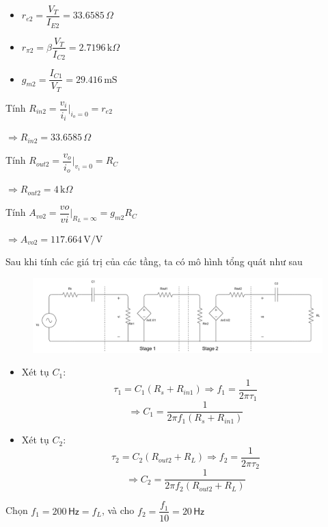 \begin{itemize}[label=-]
	\begin{itemize}[label=+, leftmargin=2cm]
		\item $r_{e2} = \dfrac{V_{T}}{I_{E2}} = 33.6585\,\Omega$
		\item $r_{\pi2} = \beta\dfrac{V_{T}}{I_{C2}} = 2.7196\,\text{k}\Omega$
		\item $g_{m2} = \dfrac{I_{C1}}{V_{T}} = 29.416\,\text{mS}$
	\end{itemize}
	
	Tính $R_{in2} = \dfrac{v_{i}}{i_{i}}\bigg|_{i_{o} = 0} = r_{e2}$
	
	$\Rightarrow R_{in2} = 33.6585\,\Omega$
	
	Tính $R_{out2} = \dfrac{v_{o}}{i_{o}}\bigg|_{v_{i} = 0} = R_{C}$
	
	$\Rightarrow R_{out2} = 4\,\text{k}\Omega$
	
	Tính $A_{vo2} = \dfrac{vo}{vi}\bigg|_{R_{L} = \infty} = g_{m2} R_{C}$
	
	$\Rightarrow A_{vo2} = 117.664\,\text{V/V}$
\end{itemize}

Sau khi tính các giá trị của các tầng, ta có mô hình tổng quát như sau

\begin{figure}[H]
	\centering
	\includegraphics[width=\linewidth]{./my-chapters/my-diagrams/Question5/c_tonghopmach.png}
\end{figure}

\begin{itemize}[label=-]
	\item Xét tụ $C_{1}$:
	\[ \tau_1 = C_{1} \left( R_{s} + R_{in1} \right) \Rightarrow f_{1} = \dfrac{1}{2\pi \tau_1} \]
	\[ \Rightarrow C_{1} = \dfrac{1}{2\pi f_{1} \left( R_{s} + R_{in1} \right)} \]
	
	\item Xét tụ $C_{2}$:
	\[ \tau_{2} = C_{2} \left( R_{out2} + R_{L}\right) \Rightarrow f_{2} = \dfrac{1}{2\pi \tau_{2}}\]
	\[ \Rightarrow C_{2} = \dfrac{1}{2\pi f_{2} \left( R_{out2} + R_{L}\right)}\]
\end{itemize}

Chọn $f_{1} = 200\,\textsf{Hz} = f_{L}$, và cho $f_{2} = \dfrac{f_{1}}{10} = 20\,\textsf{Hz}$

